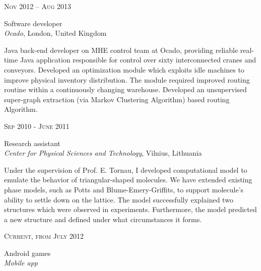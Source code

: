 \documentclass[10pt]{article} %
\begin{document}
{\begin{minipage}[t]{0.5\textwidth}

{\raggedleft\textsc{Nov 2012 – Aug 2013}\par}

{\raggedright\large Software developer\\
\textit{Ocado}, London, United Kingdom\\[5pt]}

\normalsize{Java back-end developer on MHE control team at Ocado, providing reliable real-time Java application responsible for control over sixty interconnected cranes and conveyors. Developed an optimization module which exploits idle machines to improve physical inventory distribution. The module required improved routing routine within a continuously changing warehouse. 
Developed an unsupervised super-graph extraction (via Markov Clustering  Algorithm) based routing Algorithm.}\\


{\raggedleft\textsc{Sep 2010 - June 2011}\par}

{\raggedright\large Research assistant\\
\textit{Center for Physical Sciences and Technology}, Vilnius, Lithuania\\[5pt]}

\normalsize{Under the supervision of Prof. E. Tornau, I developed computational model to emulate the behavior of triangular-shaped molecules. We have extended existing phase models, such as Potts and Blume-Emery-Griffits, to support molecule's ability to settle down on the lattice. The model successfully explained two structures which were observed in experiments. Furthermore, the model predicted a new structure and defined under what circumstances it forms.}\\


{\raggedleft\textsc{Current, from July 2012}\par}

{\raggedright\large Android games\\
\textit{Mobile app}\\[5pt]}


\end{minipage}}
\end{document}
